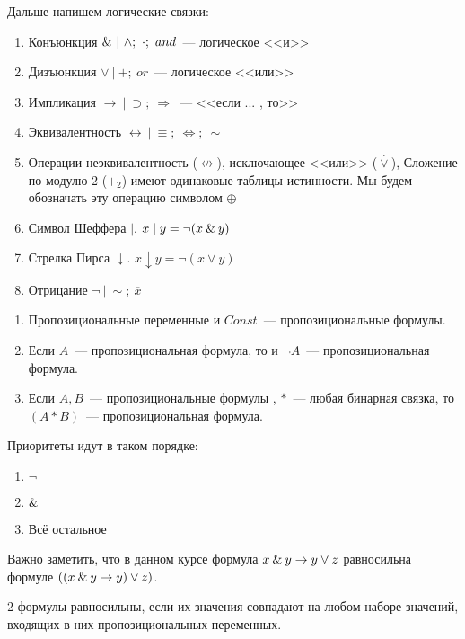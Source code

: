 \documentclass[main]{subfiles}
\begin{document}
Дальше напишем логические связки:
\begin{enumerate}
    \item Конъюнкция $\and\ |\ \land;\ \cdot;\ and $~--- логическое <<и>>
    \item Дизъюнкция $\lor\ |\ +;\ or$~---  логическое <<или>>
    \item Импликация $\to\ |\ \supset;\ \Rightarrow$~--- <<если ... , то>>
    \item Эквивалентность $\leftrightarrow\ |\ \equiv;\ \Leftrightarrow;\ \sim$
    \item Операции неэквивалентность ($\not\leftrightarrow$), исключающее <<или>> ($\stackrel{\cdot}{\lor}$), Сложение по модулю 2 ($+_2$) имеют одинаковые таблицы истинности. Мы будем обозначать эту операцию символом $\oplus$
    \item Символ Шеффера $ \mid$.   $x\mid y = \lnot(x\mathbin{\&} y)$
    \item Стрелка Пирса $\downarrow$.   $x\downarrow y = \lnot(x\lor y)$
    \item Отрицание $\lnot\ |\ \sim;\ \overline{x}$
\end{enumerate}
\begin{definition}
    \begin{enumerate}
        \item Пропозициональные переменные и $Const$~---
              пропозициональные формулы.
        \item Если $A$~--- пропозициональная
              формула, то и $\lnot A$~--- пропозициональная формула.
        \item Если $A, B$~--- пропозициональные формулы , $*$~--- любая бинарная
              связка, то $(A * B)$~--- пропозициональная формула.
    \end{enumerate}
\end{definition}
Приоритеты идут в таком порядке:
\begin{enumerate}
    \item $\lnot$
    \item $\mathbin{\&}$
    \item Всё остальное
\end{enumerate}
\begin{remark}
    Важно заметить, что в данном курсе формула $x\mathbin{\&} y \to y\lor z$ равносильна формуле $((x\mathbin{\&} y \to y) \lor z)$.
\end{remark}
\begin{definition}
    2 формулы равносильны, если их значения совпадают на любом наборе значений,
    входящих в них пропозициональных переменных.
\end{definition}
\end{document}
